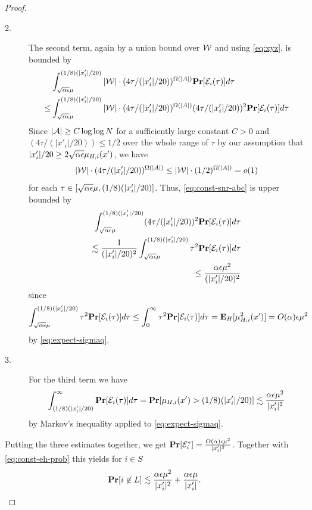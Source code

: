 \begin{proof}
\begin{description}
\item[2.] The second term, again by a union bound over $\mathcal{W}$ and using \eqref{eq:xyz}, is bounded by 
\begin{equation}\label{eq:const-snr-abc}
\begin{split}
&\int_{\sqrt{\alpha {\epsilon}}\mu}^{(1/8)(|x'_i|/20)} |\mathcal{W}|\cdot (4\tau /(|x'_i|/20))^{\Omega(|A|)} {\bf \mbox{\bf Pr}}[{\mathcal{E}}_i(\tau)]d\tau\\
\leq &\int_{\sqrt{\alpha {\epsilon}}\mu}^{(1/8)(|x'_i|/20)} |\mathcal{W}|\cdot (4\tau /(|x'_i|/20))^{\Omega(|A|)} (4\tau /(|x'_i|/20))^{2}{\bf \mbox{\bf Pr}}[{\mathcal{E}}_i(\tau)] d\tau\\
\end{split}
\end{equation}
Since $|{\mathcal{A}}|\geq C\log \log N$ for a sufficiently large constant $C>0$ and $(4\tau /(|x'_i|/20))\leq 1/2$ over the whole range of $\tau$ by our assumption that $|x'_i|/20\geq 2\sqrt{\alpha{\epsilon}} \mu_{H, i}(x')$, we have
$$
|\mathcal{W}|\cdot (4\tau /(|x'_i|/20))^{\Omega(|A|)}\leq |\mathcal{W}|\cdot (1/2)^{\Omega(|A|)}=o(1)
$$ 
for each $\tau\in [\sqrt{\alpha {\epsilon}}\mu, (1/8)(|x'_i|/20)]$. Thus, \eqref{eq:const-snr-abc} is upper bounded by
\begin{equation*}
\begin{split}
\int_{\sqrt{\alpha {\epsilon}}\mu}^{(1/8)(|x'_i|/20)} (4\tau /(|x'_i|/20))^{2}{\bf \mbox{\bf Pr}}[{\mathcal{E}}_i(\tau)] d\tau\\
\lesssim \frac1{(|x'_i|/20)^{2}}\int_{\sqrt{\alpha {\epsilon}}\mu}^{(1/8)(|x'_i|/20)} \tau^2{\bf \mbox{\bf Pr}}[{\mathcal{E}}_i(\tau)] d\tau\\
\leq \frac{\alpha {\epsilon} \mu^2}{(|x'_i|/20)^2}\\
\end{split}
\end{equation*}
since 
$$
\int_{\sqrt{\alpha {\epsilon}}\mu}^{(1/8)(|x'_i|/20)} \tau^2{\bf \mbox{\bf Pr}}[{\mathcal{E}}_i(\tau)] d\tau\leq \int_{0}^{\infty} \tau^2{\bf \mbox{\bf Pr}}[{\mathcal{E}}_i(\tau)] d\tau={\bf \mbox{\bf E}}_H[\mu^2_{H, i}(x')]=O(\alpha){\epsilon} \mu^2
$$
by \eqref{eq:expect-sigmaq}.


\item [3.] For the third term we have
$$
\int_{(1/8)(|x'_i|/20)}^\infty {\bf \mbox{\bf Pr}}[{\mathcal{E}}_i(\tau)]d\tau={\bf \mbox{\bf Pr}}[\mu_{H, i}(x')>(1/8)(|x'_i|/20)]\lesssim \frac{\alpha {\epsilon} \mu^2}{|x'_i|^2}
$$
by Markov's inequality applied to \eqref{eq:expect-sigmaq}.
\end{description}
Putting the three estimates together, we get ${\bf \mbox{\bf Pr}}[{\mathcal{E}}_i^*]=\frac{O(\alpha){\epsilon} \mu^2}{|x'_i|^2}$. Together with \eqref{eq:const-eh-prob} this yields for $i\in S$
$$
{\bf \mbox{\bf Pr}}[i\not \in L]\lesssim \frac{\alpha {\epsilon} \mu^2}{|x'_i|^2}+\frac{\alpha {\epsilon} \mu}{|x'_i|}.
$$


\end{proof}
